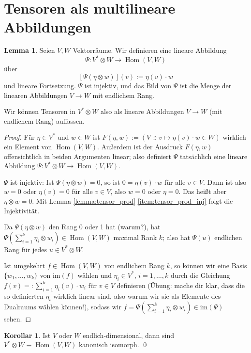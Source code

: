\documentclass[a4paper]{scrreprt}
\numberwithin{equation}{chapter}
\DeclareMathOperator{\Hom}{Hom}
\theoremstyle{definition}
\newtheorem{lemma}[defn]{Lemma}
\newtheorem{kor}[defn]{Korollar}
\begin{document}
\section{Tensoren als multilineare Abbildungen}

\begin{lemma}
	Seien $V,W$ Vektorräume. Wir definieren eine lineare Abbildung
	\[\Psi\colon V^*\otimes W \to \Hom(V,W)\]
	über
	\[[\Psi(\eta\otimes w)](v) := \eta(v) \cdot w\]
	und lineare Fortsetzung. $\Psi$ ist injektiv, und das Bild von $\Psi$ ist die Menge der linearen Abbildungen $V\to W$ mit endlichem Rang.

	Wir können Tensoren in $V^*\otimes W$ also als lineare Abbildungen $V\to W$ (mit endlichem Rang) auffassen.

	\begin{proof}
		Für $\eta \in V^*$ und $w\in W$ ist $F(\eta,w) := (V \ni v \mapsto \eta(v) \cdot w \in W)$ wirklich ein Element von $\Hom(V,W)$. Außerdem ist der Ausdruck $F(\eta,w)$ offensichtlich in beiden Argumenten linear; also definiert $\Psi$ tatsächlich eine lineare Abbildung $\Psi\colon V^*\otimes W \to \Hom(V,W)$.

		$\Psi$ ist injektiv: Ist $\Psi(\eta \otimes w) = 0$, so ist $0 = \eta(v) \cdot w$ für alle $v\in V$. Dann ist also $w=0$ oder $\eta(v) = 0$ für alle $v\in V$, also $w=0$ oder $\eta=0$. Das heißt aber $\eta \otimes w = 0$. Mit Lemma \ref{lemma:tensor_prod} \ref{item:tensor_prod_inj} folgt die Injektivität.

		Da $\Psi(\eta\otimes w)$ den Rang 0 oder 1 hat (warum?), hat $\Psi\left(\sum_{i=1}^k \eta_i \otimes w_i\right) \in \Hom(V,W)$ maximal Rank $k$; also hat $\Psi(u)$ endlichen Rang für jedes $u\in V^*\otimes W$.

		Ist umgekehrt $f\in\Hom(V,W)$ von endlichem Rang $k$, so können wir eine Basis $\{w_1,\dots,w_k\}$ von $\mathrm{im}(f)$ wählen und $\eta_i \in V^*$, $i=1,\dots,k$ durch die Gleichung $f(v) =: \sum_{i=1}^k \eta_i(v) \cdot w_i$ für $v\in V$ definieren (Übung: mache dir klar, dass die so definierten $\eta_i$ wirklich linear sind, also warum wir sie als Elemente des Dualraums wählen können!), sodass wir $f = \Psi\left(\sum_{i=1}^k \eta_i \otimes w_i\right) \in \mathrm{im}(\Psi)$ sehen.
	\end{proof}
\end{lemma}
\begin{kor}
	Ist $V$ oder $W$ endlich-dimensional, dann sind $V^* \otimes W \equiv \Hom(V,W)$ kanonisch isomorph. \qed
\end{kor}
\end{document}
